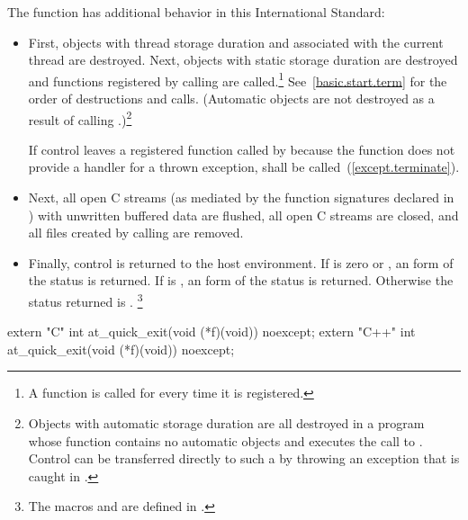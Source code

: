 \begin{itemdescr}
\pnum
The function
has additional behavior in this International Standard:

\begin{itemize}
\item
First, objects with thread storage duration and associated with the current thread
are destroyed. Next, objects with static storage duration are destroyed
and functions registered by calling
are called.\footnote{A function is called for every time it is registered.}
See~\ref{basic.start.term} for the order of destructions and calls.
(Automatic objects are not destroyed as a result of calling
.)\footnote{Objects with automatic storage duration are all destroyed in a program whose
function
contains no automatic objects and executes the call to
.
Control can be transferred directly to such a
by throwing an exception that is caught in
.}

If control leaves a registered function called by  because the function does
not provide a handler for a thrown exception,  shall be called~(\ref{except.terminate}).%

\item
Next, all open C streams (as mediated by the function
signatures declared in
)
with unwritten buffered data are flushed, all open C
streams are closed, and all files created by calling
are removed.

\item
Finally, control is returned to the host environment.
If  is zero or
,
an 
form of the status
is returned.
%
If  is
,
an  form of the status
is returned.
%
Otherwise the status returned is .%
\footnote{The macros
and
are defined in
.}
\end{itemize}

\end{itemdescr}

\begin{itemdecl}
extern "C" int at_quick_exit(void (*f)(void)) noexcept;
extern "C++" int at_quick_exit(void (*f)(void)) noexcept;
\end{itemdecl}

